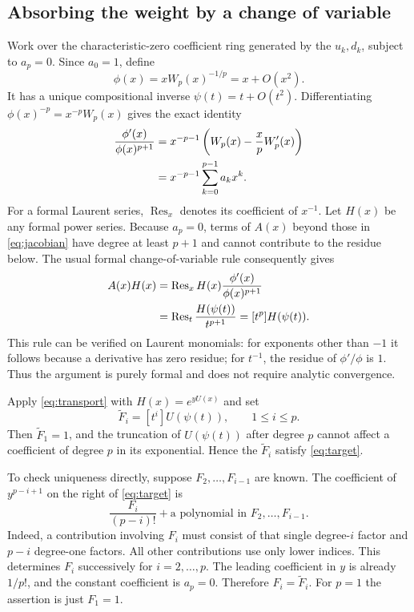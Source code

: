 \documentclass[11pt]{article}
\newcommand{\Res}{\operatorname{Res}}
\begin{document}
\subsection*{Absorbing the weight by a change of variable}
Work over the characteristic-zero coefficient ring generated by the
$u_k,d_k$, subject to $a_p=0$. Since $a_0=1$, define
\[
 \phi(x)=xW_p(x)^{-1/p}=x+O(x^2).
\]
It has a unique compositional inverse $\psi(t)=t+O(t^2)$.
Differentiating $\phi(x)^{-p}=x^{-p}W_p(x)$ gives the exact identity
\begin{align}
 \frac{\phi'(x)}{\phi(x)^{p+1}}
 &=x^{-p-1}\left(W_p(x)-\frac{x}{p}W_p'(x)\right)\notag\\
 &=x^{-p-1}\sum_{k=0}^{p-1}a_kx^k.\label{eq:jacobian}
\end{align}
For a formal Laurent series, $\Res_x$ denotes its coefficient of
$x^{-1}$. Let $H(x)$ be any formal power series. Because $a_p=0$,
terms of $A(x)$ beyond those in \eqref{eq:jacobian} have degree at
least $p+1$ and cannot contribute to the residue below. The usual
formal change-of-variable rule consequently gives
\begin{align}
 [x^p]A(x)H(x)
 &=\Res_x H(x)\frac{\phi'(x)}{\phi(x)^{p+1}}\notag\\
 &=\Res_t\frac{H(\psi(t))}{t^{p+1}}
  =[t^p]H(\psi(t)).\label{eq:transport}
\end{align}
This rule can be verified on Laurent monomials: for exponents other
than $-1$ it follows because a derivative has zero residue; for
$t^{-1}$, the residue of $\phi'/\phi$ is $1$. Thus the argument is
purely formal and does not require analytic convergence.

Apply \eqref{eq:transport} with $H(x)=e^{yU(x)}$ and set
\[
 \widetilde F_i=[t^i]U(\psi(t)),\qquad 1\le i\le p.
\]
Then $\widetilde F_1=1$, and the truncation of $U(\psi(t))$ after
degree $p$ cannot affect a coefficient of degree $p$ in its exponential.
Hence the $\widetilde F_i$ satisfy \eqref{eq:target}.

To check uniqueness directly, suppose $F_2,\ldots,F_{i-1}$ are
known. The coefficient of $y^{p-i+1}$ on the right of
\eqref{eq:target} is
\[
 \frac{F_i}{(p-i)!}
       +\text{a polynomial in }F_2,\ldots,F_{i-1}.
\]
Indeed, a contribution involving $F_i$ must consist of that single
degree-$i$ factor and $p-i$ degree-one factors. All other contributions
use only lower indices. This determines $F_i$ successively for
$i=2,\ldots,p$. The leading coefficient in $y$ is already $1/p!$,
and the constant coefficient is $a_p=0$. Therefore
$F_i=\widetilde F_i$. For $p=1$ the assertion is just $F_1=1$.
\end{document}
